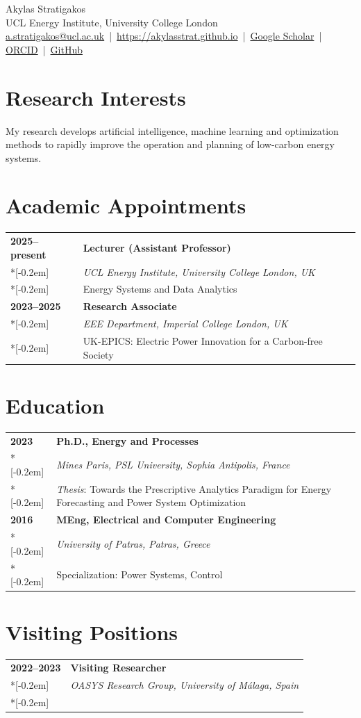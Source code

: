 \documentclass[11pt,a4paper]{article}
\makeatletter
\newlength{\datecolwidth}
\newenvironment{entrylist}{%
  \begin{longtable}{@{}p{\datecolwidth}@{\hspace{0.8em}}p{\dimexpr\linewidth-\datecolwidth-0.8em\relax}@{}}%
}{\end{longtable}}
\newcommand{\entry}[4]{%
  \textbf{#1} & \textbf{#2}\\*[-0.2em]
              & {\itshape #3}\\*[-0.2em]
              & #4\\[0.8em]
}
\newcommand{\name}{Akylas Stratigakos}
\newcommand{\affiliation}{UCL Energy Institute, University College London}
\newcommand{\emailaddr}{a.stratigakos@ucl.ac.uk}
\newcommand{\website}{https://akylasstrat.github.io}
\newcommand{\scholar}{https://scholar.google.com/citations?user=RBrai44AAAAJ&hl=en}   %
\newcommand{\orcid}{https://orcid.org/0000-0002-9954-5558}
\newcommand{\github}{https://github.com/akylasstrat}
\makeatother
\begin{document}
\begin{center}
  {\LARGE \name}\\[2pt]
  \affiliation\\[6pt]
  \href{mailto:\emailaddr}{\emailaddr} \,|\, \href{\website}{\website} \,|\,
  \href{\scholar}{Google Scholar} \,|\, \href{\orcid}{ORCID} \,|\, \href{\github}{GitHub}
\end{center}

\section*{Research Interests}

My research develops artificial intelligence, machine learning and optimization methods to rapidly improve
the operation and planning of low-carbon energy systems.


\section*{Academic Appointments}
\begin{entrylist}
  \entry{2025--present}{Lecturer (Assistant Professor)}{UCL Energy Institute, University College London, UK}{
    Energy Systems and Data Analytics
  }
  \entry{2023--2025}{Research Associate}{EEE Department, Imperial College London, UK}{
    UK-EPICS: Electric Power Innovation for a Carbon-free Society
  }
\end{entrylist}

\section*{Education}
\begin{entrylist}
  \entry{2023}{Ph.D., Energy and Processes}{Mines Paris, PSL University, Sophia Antipolis, France}
  {\emph{Thesis}: Towards the Prescriptive Analytics Paradigm for Energy Forecasting and Power System Optimization}
  \entry{2016}{MEng, Electrical and Computer Engineering}{University of Patras, Patras, Greece}{
    Specialization: Power Systems, Control}
\end{entrylist}

\section*{Visiting Positions}
\begin{entrylist}
  \entry{2022--2023}{Visiting Researcher}{OASYS Research Group, University of M\'alaga, Spain}{}
\end{entrylist}
\end{document}
